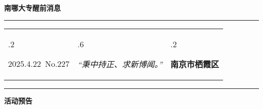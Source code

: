 \documentclass[letterpaper, 12pt]{article}
\begin{document}
\begin{center}
    \Huge\textbf{南哪大专醒前消息}
\end{center}
\vspace{4mm}
\hrule
\renewcommand\tabularxcolumn[1]{m{#1}}
\begin{tabularx}{\textwidth}{>{\hsize.2\hsize}X>{\hsize.6\hsize}X>{\hsize.2\hsize}X}
    \begin{flushleft}
        2025.4.22\, No.227
    \end{flushleft}
    &
    \begin{center}
        \textit{“秉中持正、求新博闻。”}
    \end{center}
    &
    \begin{flushright}
        \textbf{南京市栖霞区}
    \end{flushright}
\end{tabularx}
\vspace{-3.5mm}
\hrule
\vspace{4mm}
\centerline{\huge\textbf{活动预告}}
\end{document}
